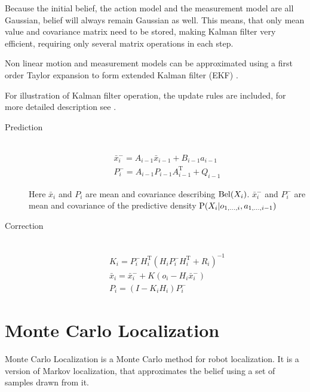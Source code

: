 Because the initial belief, the action model and the measurement model are all Gaussian,
belief will always remain Gaussian as well.
This means, that only mean value and covariance matrix need to be stored, making
Kalman filter very efficient, requiring only several matrix operations in each step.

Non linear motion and measurement models can be approximated
using a first order Taylor expansion to form extended Kalman
filter (EKF) \cite{welch95}.

For illustration of Kalman filter operation, the update rules are included,
for more detailed description see \cite{welch95}.

\begin{description}
\item[Prediction] \hfill \\
\begin{gather}
	\bar{x}^{-}_i = A_{i - 1}\bar{x}_{i-1} + B_{i - 1}a_{i - 1}
	\\
	P^{-}_i = A_{i - 1}P_{i - 1}A^\mathrm{T}_{i - 1} + Q_{i - 1}
\end{gather}

Here \(\bar{x}_i\) and \(P_i\) are mean and covariance describing \(\Bel(X_i)\).
\(\bar{x}^{-}_i\) and \(P^{-}_i\) are mean and covariance of the predictive density
\(\P(X_i | o_{1, \dotsc, i}, a_{1, \dotsc, i - 1})\)

\item[Correction] \hfill \\
\begin{gather}
	\label{eq:kalman-gain}
	K_i = P^{-}_{i}H^\mathrm{T}_{i}(H_{i}P^{-}_{i}H^\mathrm{T}_{i} + R_{i})^{-1}
	\\
	\bar{x}_i = \bar{x}^{-}_i + K (o_i - H_{i}\bar{x}^{-}_i)
	\\
	P_i = (I - K_{i}H_{i})P^{-}_i
\end{gather}
\end{description}


\section{Monte Carlo Localization}
\label{sec:mcl-algorithm}


Monte Carlo Localization \cite{dellaert99} is a Monte Carlo method for
robot localization.
It is a version of Markov localization, that approximates the belief
using a set of samples drawn from it.

